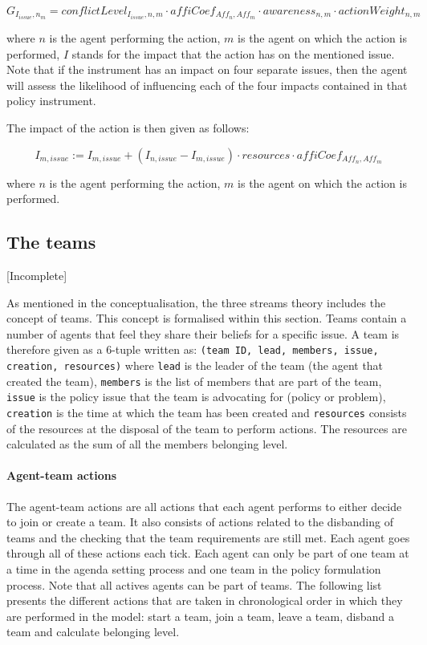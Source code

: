 \begin{equation}
G_{I_{issue}, n_m} = conflictLevel_{I_{issue}, n, m} \cdot affiCoef_{Aff_n,Aff_m} \cdot awareness_{n,m} \cdot actionWeight_{n,m}
\end{equation}

where $n$ is the agent performing the action, $m$ is the agent on which the action is performed, $I$ stands for the impact that the action has on the mentioned issue. Note that if the instrument has an impact on four separate issues, then the agent will assess the likelihood of influencing each of the four impacts contained in that policy instrument.

The impact of the action is then given as follows:

\begin{equation}
I_{m, issue} := I_{m, issue} + \left( I_{n, issue} - I_{m, issue} \right) \cdot resources \cdot affiCoef_{Aff_n,Aff_m}
\end{equation}

where $n$ is the agent performing the action, $m$ is the agent on which the action is performed.


\subsection{The teams} [Incomplete]


As mentioned in the conceptualisation, the three streams theory includes the concept of teams. This concept is formalised within this section.
Teams contain a number of agents that feel they share their beliefs for a specific issue. A team is therefore given as a 6-tuple written as: \texttt{(team ID, lead, members, issue, creation, resources)} where \texttt{lead} is the leader of the team (the agent that created the team), \texttt{members} is the list of members that are part of the team, \texttt{issue} is the policy issue that the team is advocating for (policy or problem), \texttt{creation} is the time at which the team has been created and \texttt{resources} consists of the resources at the disposal of the team to perform actions. The resources are calculated as the sum of all the members belonging level.

\paragraph{Agent-team actions}

The agent-team actions are all actions that each agent performs to either decide to join or create a team. It also consists of actions related to the disbanding of teams and the checking that the team requirements are still met. Each agent goes through all of these actions each tick. Each agent can only be part of one team at a time in the agenda setting process and one team in the policy formulation process. Note that all actives agents can be part of teams. The following list presents the different actions that are taken in chronological order in which they are performed in the model: start a team, join a team, leave a team, disband a team and calculate belonging level.

